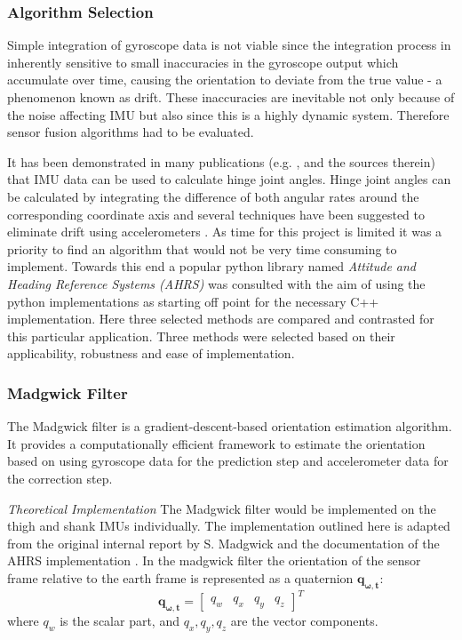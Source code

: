 \subsubsection{Algorithm Selection}
Simple integration of gyroscope data is not viable since the integration process in inherently sensitive to small inaccuracies in the gyroscope output which accumulate over time, causing the orientation to deviate from the true value - a phenomenon known as drift. These inaccuracies are inevitable not only because of the noise affecting IMU but also since this is a highly dynamic system. Therefore sensor fusion algorithms had to be evaluated.

It has been demonstrated in many publications (e.g. \cite{peng_cheng_joint-angle_2010}, \cite{sabatini_estimating_2011} and the sources therein) that IMU data can be used to calculate hinge joint angles. Hinge joint angles can be calculated by integrating the difference of both angular rates around the corresponding coordinate axis and several techniques have been suggested to eliminate drift using accelerometers \cite{peng_cheng_joint-angle_2010}. As time for this project is limited it was a priority to find an algorithm that would not be very time consuming to implement. Towards this end a popular python library named \textit{Attitude and Heading Reference Systems (AHRS)} \cite{noauthor_ahrs_nodate} was consulted with the aim of using the python implementations as starting off point for the necessary C++ implementation. Here three selected methods are compared and contrasted for this particular application. Three methods were selected based on their applicability, robustness and ease of implementation. 



\subsubsection{Madgwick Filter}

The Madgwick filter is a gradient-descent-based orientation estimation algorithm. It provides a computationally efficient framework to estimate the orientation based on using gyroscope data for the prediction step and accelerometer data for the correction step. 

\textit{Theoretical Implementation}
The Madgwick filter would be implemented on the thigh and shank IMUs individually. The implementation outlined here is adapted from the original internal report by S. Madgwick  \cite{madgwick_ecient_nodate} and the documentation of the AHRS implementation \cite{noauthor_madgwick_nodate}. In the madgwick filter the orientation of the sensor frame relative to the earth frame is represented as a quaternion \( \mathbf{q_{\omega , t}} \):
\[
\mathbf{q_{\omega , t}} = 
\begin{bmatrix}
q_w & q_x & q_y & q_z
\end{bmatrix}^T
\]
where \( q_w \) is the scalar part, and \( q_x, q_y, q_z \) are the vector components.

